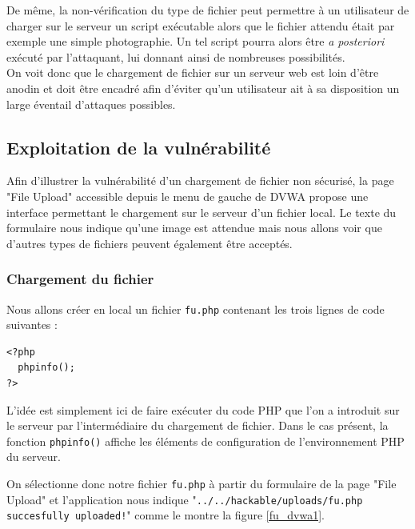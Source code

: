 De même, la non-vérification du type de fichier peut permettre à un utilisateur de charger sur le serveur un script exécutable alors que le fichier attendu était par exemple une simple photographie. Un tel script pourra alors être \textit{a posteriori} exécuté par l'attaquant, lui donnant ainsi de nombreuses possibilités.\\

On voit donc que le chargement de fichier sur un serveur web est loin d'être anodin et doit être encadré afin d'éviter qu'un utilisateur ait à sa disposition un large éventail d'attaques possibles.


\subsection{Exploitation de la vulnérabilité}

Afin d'illustrer la vulnérabilité d'un chargement de fichier non sécurisé, la page "File Upload" accessible depuis le menu de gauche de DVWA propose une interface permettant le chargement sur le serveur d'un fichier local. Le texte du formulaire nous indique qu'une image est attendue mais nous allons voir que d'autres types de fichiers peuvent également être acceptés.

\subsubsection{Chargement du fichier}

Nous allons créer en local un fichier \texttt{fu.php} contenant les trois lignes de code suivantes :

\begin{lstlisting}
<?php
  phpinfo();
?>
\end{lstlisting}

L'idée est simplement ici de faire exécuter du code PHP que l'on a introduit sur le serveur par l'intermédiaire du chargement de fichier. Dans le cas présent, la fonction \texttt{phpinfo()} affiche les éléments de configuration de l'environnement PHP du serveur.

On sélectionne donc notre fichier \texttt{fu.php} à partir du formulaire de la page "File Upload" et l'application nous indique "\texttt{../../hackable/uploads/fu.php succesfully uploaded!}" comme le montre la figure \ref{fu_dvwa1}.

